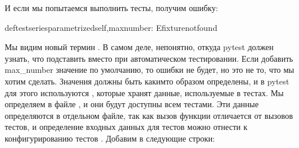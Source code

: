\documentclass[letterpaper,10pt,russian]{sphinxmanual}
\begin{document}
\begin{sphinxVerbatim}[commandchars=\\\{\}]
 

   

 
      
          
          
            
                
           
\end{sphinxVerbatim}

\sphinxAtStartPar
И если мы попытаемся выполнить тесты, получим ошибку:

\begin{sphinxVerbatim}[commandchars=\\\{\}]
deftest\PYGZus{}series\PYGZus{}parametrizedself,max\PYGZus{}number:
Efixturenotfound
\end{sphinxVerbatim}

\sphinxAtStartPar
Мы видим новый термин . В самом деле, непонятно, откуда pytest должен узнать, что подставить вместо  при автоматическом тестировании. Если добавить max\_number значение по умолчанию, то ошибки не будет, но это не то, что мы хотим сделать. Значения  должны быть каким\sphinxhyphen{}то образом определены, и в pytest для этого используются , которые хранят данные, используемые в тестах. Мы определяем  в файле , и они будут доступны всем тестами. Эти данные определяются в отдельном файле, так как вызов функции отличается от вызовов тестов, и определение входных данных для тестов можно отнести к конфигурированию тестов . Добавим в  следующие строки:
\end{document}
